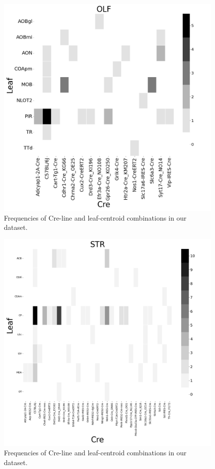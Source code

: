 \begin{figure}[H]
    \centering
    \includegraphics[width = 7in]{figs/OLF centroid density.png} 
    \caption{Frequencies of Cre-line and leaf-centroid combinations in our dataset.}
    \label{fig:my_label}
\end{figure}
\newpage

\begin{figure}[H]
    \centering
    \includegraphics[width = 7in]{figs/STR centroid density.png} 
    \caption{Frequencies of Cre-line and leaf-centroid combinations in our dataset.}
    \label{fig:my_label}
\end{figure}
\newpage

